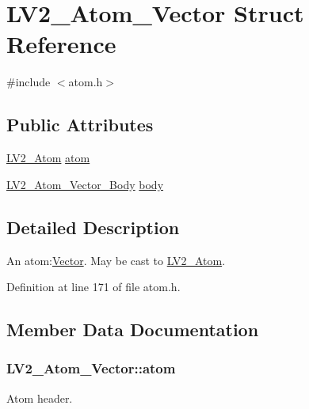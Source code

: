 \hypertarget{struct_l_v2___atom___vector}{}\section{L\+V2\+\_\+\+Atom\+\_\+\+Vector Struct Reference}
\label{struct_l_v2___atom___vector}


{\ttfamily \#include $<$atom.\+h$>$}

\subsection*{Public Attributes}
\begin{DoxyCompactItemize}
\item 
\hyperlink{struct_l_v2___atom}{L\+V2\+\_\+\+Atom} \hyperlink{struct_l_v2___atom___vector_a65162941b427fe7c9799cfb28a50020a}{atom}
\item 
\hyperlink{struct_l_v2___atom___vector___body}{L\+V2\+\_\+\+Atom\+\_\+\+Vector\+\_\+\+Body} \hyperlink{struct_l_v2___atom___vector_ab250440435a935db47a5a276c9c8cae1}{body}
\end{DoxyCompactItemize}


\subsection{Detailed Description}
An atom\+:\hyperlink{class_vector}{Vector}. May be cast to \hyperlink{struct_l_v2___atom}{L\+V2\+\_\+\+Atom}. 

Definition at line 171 of file atom.\+h.



\subsection{Member Data Documentation}
\subsubsection[{\texorpdfstring{atom}{atom}}]{ L\+V2\+\_\+\+Atom\+\_\+\+Vector\+::atom}\hypertarget{struct_l_v2___atom___vector_a65162941b427fe7c9799cfb28a50020a}{}\label{struct_l_v2___atom___vector_a65162941b427fe7c9799cfb28a50020a}
Atom header. 

